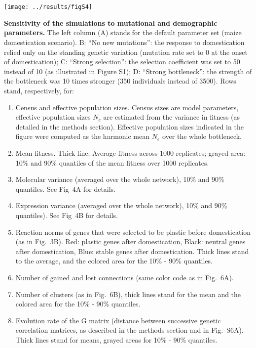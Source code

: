 \documentclass[10pt,a4paper]{article}
\begin{document}
\clearpage

\section{}

\begin{center}
\texttt{[image: ../results/figS4]}
\end{center}

\textbf{Sensitivity of the simulations to mutational and demographic parameters.} The left column (A) stands for the default parameter set (maize domestication scenario). B: “No new mutations”: the response to domestication relied only on the standing genetic variation (mutation rate set to 0 at the onset of domestication); C: “Strong selection”: the selection coefficient was set to 50 instead of 10 (as illustrated in Figure S1); D: “Strong bottleneck”: the strength of the bottleneck was 10 times stronger (350 individuals instead of 3500). Rows stand, respectively, for:
\begin{enumerate}
	\item Census and effective population sizes. Census sizes are model parameters, effective population sizes $N_e$ are estimated from the variance in fitness (as detailed in the methods section). Effective population sizes indicated in the figure were computed as the harmonic mean $N_e$ over the whole bottleneck. 
	\item Mean fitness. Thick line: Average fitness across 1000 replicates; grayed area: 10\% and 90\% quantiles of the mean fitness over 1000 replicates. 
	\item Molecular variance (averaged over the whole network), 10\% and 90\% quantiles. See Fig\ 4A for details. 
	\item Expression variance (averaged over the whole network), 10\% and 90\% quantiles). See Fig\ 4B for details.  
	\item Reaction norms of genes that were selected to be plastic before domestication (as in Fig.\ 3B). Red: plastic genes after domestication, Black: neutral genes after domestication, Blue: stable genes after domestication. Thick lines stand to the average, and the colored area for the 10\% - 90\% quantiles. 
	\item Number of gained and lost connections (same color code as in Fig.\ 6A). 
	\item Number of clusters (as in Fig.\ 6B), thick lines stand for the mean and the colored area for the 10\% - 90\% quantiles. 
	\item Evolution rate of the G matrix (distance between successive genetic correlation matrices, as described in the methods section and in Fig.\ S6A). Thick lines stand for means, grayed areas for 10\% - 90\% quantiles. 
\end{enumerate}
\end{document}
